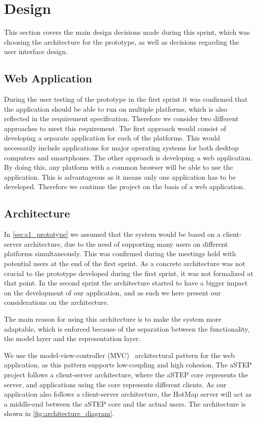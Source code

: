 \section{Design} \label{sec:s2_design}
This section covers the main design decisions made during this sprint, which was choosing the architecture for the prototype, as well as decisions regarding the user interface design.

\subsection{Web Application}
During the user testing of the prototype in the first sprint it was confirmed that the application should be able to run on multiple platforms, which is also reflected in the requirement specification. Therefore we consider two different approaches to meet this requirement. The first approach would consist of developing a separate application for each of the platforms. This would necessarily include applications for major operating systems for both desktop computers and smartphones. The other approach is developing a web application. By doing this, any platform with a common browser will be able to use the application. This is advantageous as it means only one application has to be developed. Therefore we continue the project on the basis of a web application. 

\subsection{Architecture} \label{sec:s2_architecture}
In \cref{sec:s1_prototype} we assumed that the system would be based on a client-server architecture, due to the need of supporting many users on different platforms simultaneously. This was confirmed during the meetings held with potential users at the end of the first sprint. As a concrete architecture was not crucial to the prototype developed during the first sprint, it was not formalized at that point. In the second sprint the architecture started to have a bigger impact on the development of our application, and as such we here present our considerations on the architecture.

The main reason for using this architecture is to make the system more adaptable, which is enforced because of the separation between the functionality, the model layer and the representation layer.

We use the model-view-controller (MVC)~\cite{website:MVC} architectural pattern for the web application, as this pattern supports low-coupling and high cohesion. The aSTEP project follows a client-server architecture, where the aSTEP core represents the server, and applications using the core represents different clients. As our application also follows a client-server architecture, the HotMap server will act as a middle-end between the aSTEP core and the actual users. The architecture is shown in \cref{fig:architecture_diagram}.

